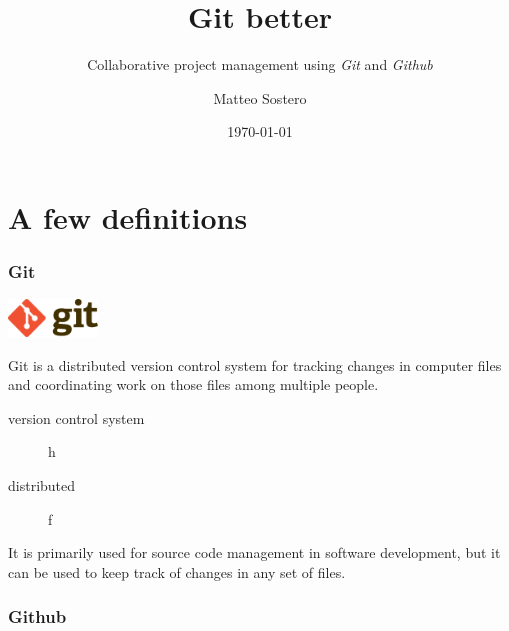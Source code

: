 \documentclass[10pt]{beamer}
\title{Git better}
\subtitle{Collaborative project management using \emph{Git} and \emph{Github}}
\date{\today}
\author{Matteo Sostero}
\institute{Sant'Anna School of Advanced Studies}
\begin{document}
\maketitle



\section{A few definitions}

\begin{frame}
\frametitle{Git}

\includegraphics[height=1cm]{Git-logo}

Git is a distributed version control system for tracking changes in computer files and coordinating work on those files among multiple people. 

\begin{description}
\item[version control system] h
\item[distributed] f
\end{description}

It is primarily used for source code management in software development, but it can be used to keep track of changes in any set of files.
\end{frame}


\begin{frame}
\frametitle{Github}

\end{frame}




\end{document}
